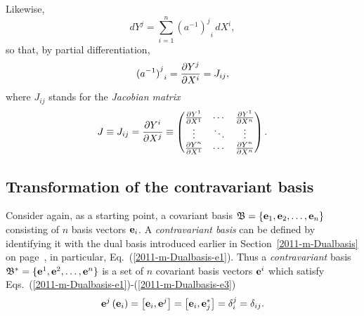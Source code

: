 Likewise,
\begin{equation}
d{ Y }^j   =
\sum_{i=1}^n {{({a^{-1}})}^j}_i\, d{X}^i,
\end{equation}
so that, by partial differentiation,
\begin{equation}
{{(a^{-1})}^j}_i =
{\partial { Y }^j \over \partial X^i}   =J_{ij},
\label{2001-mu-tensor-tl2nl}
\end{equation}
where $J_{ij}$ stands for
the {\em Jacobian matrix}
\begin{equation}
J\equiv
J_{ij}={\partial { Y }^i\over \partial {X}^j }
\equiv
\begin{pmatrix}
{\partial { Y }^1\over \partial {X}^1}&\cdots&{\partial { Y }^1\over \partial {X}^n}\\
\vdots&\ddots &\vdots\\
{\partial { Y }^n\over \partial {X}^1}&\cdots&{\partial { Y }^n\over \partial {X}^n}
\end{pmatrix} .
\label{2013-m-t-jm}
\end{equation}


\subsection{Transformation of the contravariant basis}

Consider again, as a starting point, a covariant basis
${\mathfrak B}=\{{\bf e}_1,{\bf e}_2,\ldots ,{\bf e}_n\}$ consisting of
$n$ basis vectors ${\bf e}_i$.
A {\em contravariant basis} can be defined by identifying it with the dual basis
introduced earlier in Section~\ref{2011-m-Dualbasis} on page~\pageref{2011-m-Dualbasis},
in particular, Eq.~(\ref{2011-m-Dualbasis-e1}).
Thus a {\em contravariant} basis
${\mathfrak B^\ast}=\{{\bf e}^1,{\bf e}^2,\ldots ,{\bf e}^n\}$ is a set of $n$ covariant
basis vectors ${\bf e}^i$
which satisfy Eqs.~(\ref{2011-m-Dualbasis-e1})-(\ref{2011-m-Dualbasis-e3})
\begin{equation}
{\bf e}^j \left( {\bf e}_i \right) = \left[{\bf e}_i,{\bf e}^j \right] =  \left[{\bf e}_i,  {\bf e}_j^\ast \right] = \delta^j_i = \delta_{ij}
.
\label{2001-mu-tensors0}
\end{equation}

